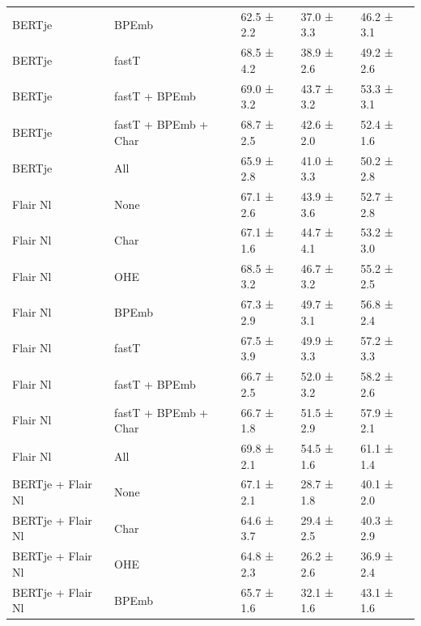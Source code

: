 \documentclass[12pt,a4paper,]{book}
\begin{document}
\begin{longtable}[t]{lllll}
\hspace{1em}BERTje & BPEmb & 62.5 ±  2.2 & 37.0 ±  3.3 & 46.2 ±  3.1\\
\hspace{1em}BERTje & fastT & 68.5 ±  4.2 & 38.9 ±  2.6 & 49.2 ±  2.6\\
\hspace{1em}BERTje & fastT + BPEmb & 69.0 ±  3.2 & 43.7 ±  3.2 & 53.3 ±  3.1\\
\hspace{1em}BERTje & fastT + BPEmb + Char & 68.7 ±  2.5 & 42.6 ±  2.0 & 52.4 ±  1.6\\
\hspace{1em}BERTje & All & 65.9 ±  2.8 & 41.0 ±  3.3 & 50.2 ±  2.8\\
\hspace{1em}Flair Nl & None & 67.1 ±  2.6 & 43.9 ±  3.6 & 52.7 ±  2.8\\
\hspace{1em}Flair Nl & Char & 67.1 ±  1.6 & 44.7 ±  4.1 & 53.2 ±  3.0\\
\hspace{1em}Flair Nl & OHE & 68.5 ±  3.2 & 46.7 ±  3.2 & 55.2 ±  2.5\\
\hspace{1em}Flair Nl & BPEmb & 67.3 ±  2.9 & 49.7 ±  3.1 & 56.8 ±  2.4\\
\hspace{1em}Flair Nl & fastT & 67.5 ±  3.9 & 49.9 ±  3.3 & 57.2 ±  3.3\\
\hspace{1em}Flair Nl & fastT + BPEmb & 66.7 ±  2.5 & 52.0 ±  3.2 & 58.2 ±  2.6\\
\hspace{1em}Flair Nl & fastT + BPEmb + Char & 66.7 ±  1.8 & 51.5 ±  2.9 & 57.9 ±  2.1\\
\hspace{1em}Flair Nl & All & 69.8 ±  2.1 & 54.5 ±  1.6 & 61.1 ±  1.4\\
\hspace{1em}BERTje + Flair Nl & None & 67.1 ±  2.1 & 28.7 ±  1.8 & 40.1 ±  2.0\\
\hspace{1em}BERTje + Flair Nl & Char & 64.6 ±  3.7 & 29.4 ±  2.5 & 40.3 ±  2.9\\
\hspace{1em}BERTje + Flair Nl & OHE & 64.8 ±  2.3 & 26.2 ±  2.6 & 36.9 ±  2.4\\
\hspace{1em}BERTje + Flair Nl & BPEmb & 65.7 ±  1.6 & 32.1 ±  1.6 & 43.1 ±  1.6\\

\end{longtable}
\end{document}
